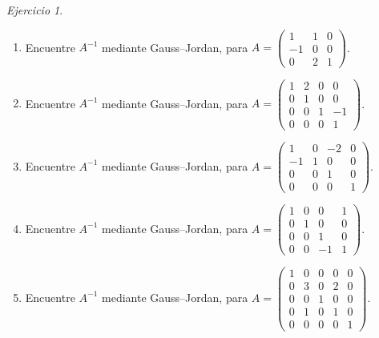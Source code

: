 \documentclass[12pt]{article}
\theoremstyle{remark}
\newtheorem{Ejer}[definicion]{Ejercicio}
\begin{document}
\begin{Ejer}
\begin{enumerate}[start=127]
\item Encuentre $A^{-1}$ mediante Gauss--Jordan, para $A=\begin{pmatrix}1&1&0\\-1&0&0\\0&2&1\end{pmatrix}$.

\item Encuentre $A^{-1}$ mediante Gauss--Jordan, para $A=\begin{pmatrix}1&2&0&0\\0&1&0&0\\0&0&1&-1\\0&0&0&1\end{pmatrix}$.

\item Encuentre $A^{-1}$ mediante Gauss--Jordan, para $A=\begin{pmatrix}1&0&-2&0\\-1&1&0&0\\0&0&1&0\\0&0&0&1\end{pmatrix}$.

\item Encuentre $A^{-1}$ mediante Gauss--Jordan, para $A=\begin{pmatrix}1&0&0&1\\0&1&0&0\\0&0&1&0\\0&0&-1&1\end{pmatrix}$.

\item Encuentre $A^{-1}$ mediante Gauss--Jordan, para $A=\begin{pmatrix}1&0&0&0&0\\0&3&0&2&0\\0&0&1&0&0\\0&1&0&1&0\\0&0&0&0&1\end{pmatrix}$.

\end{enumerate}
\end{Ejer}
\end{document}
